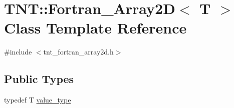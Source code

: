 \hypertarget{classTNT_1_1Fortran__Array2D}{}\section{T\+NT\+:\+:Fortran\+\_\+\+Array2D$<$ T $>$ Class Template Reference}
\label{classTNT_1_1Fortran__Array2D}


{\ttfamily \#include $<$tnt\+\_\+fortran\+\_\+array2d.\+h$>$}

\subsection*{Public Types}
\begin{DoxyCompactItemize}
\item 
typedef T \hyperlink{classTNT_1_1Fortran__Array2D_a498268efd59880dbd352e67e283ea042}{value\+\_\+type}
\end{DoxyCompactItemize}
